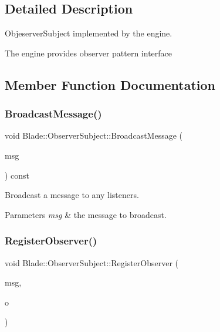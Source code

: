 \subsection{Detailed Description}
Objeserver\+Subject implemented by the engine. 

The engine provides observer pattern interface 

\subsection{Member Function Documentation}
\mbox{\label{class_blade_1_1_observer_subject_a4d8b26a245fa28769456e5f54049b86b}} 
\subsubsection{\texorpdfstring{Broadcast\+Message()}{BroadcastMessage()}}
{\footnotesize\ttfamily void Blade\+::\+Observer\+Subject\+::\+Broadcast\+Message (\begin{DoxyParamCaption}\item[{const \hyperlink{class_blade_1_1_ref_counted_container}{Message\+Container}$<$ std\+::string $>$ \&}]{msg }\end{DoxyParamCaption}) const\hspace{0.3cm}{\ttfamily [noexcept]}}



Broadcast a message to any listeners. 


\begin{DoxyParams}{Parameters}
{\em msg} & the message to broadcast. \\
\hline
\end{DoxyParams}
\mbox{\label{class_blade_1_1_observer_subject_af8e103e7a7cb33062ea5fbf189902272}} 
\subsubsection{\texorpdfstring{Register\+Observer()}{RegisterObserver()}}
{\footnotesize\ttfamily void Blade\+::\+Observer\+Subject\+::\+Register\+Observer (\begin{DoxyParamCaption}\item[{const std\+::string \&}]{msg,  }\item[{\hyperlink{class_blade_1_1_observer}{Observer} $\ast$}]{o }\end{DoxyParamCaption})\hspace{0.3cm}{\ttfamily [noexcept]}}



